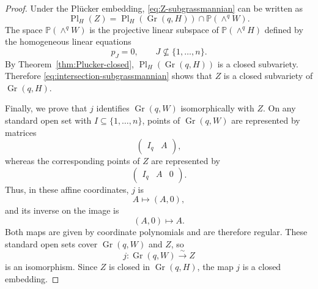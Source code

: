\documentclass[10pt,a4paper]{amsart}
\newcommand{\Gr}{\operatorname{Gr}}
\newcommand{\PP}{\mathbb P}
\newcommand{\Pl}{\operatorname{Pl}}
\begin{document}
\begin{proof}
Under the Pl\"ucker embedding, \eqref{eq:Z-subgrassmannian} can be written as
\begin{equation}\label{eq:intersection-subgrassmannian}
  \Pl_H(Z)
  =\Pl_H(\Gr(q,H))\cap\PP(\wedge^qW).
\end{equation}
The space $\PP(\wedge^qW)$ is the projective linear subspace of
$\PP(\wedge^qH)$ defined by the homogeneous linear equations
\[
  p_J=0,
  \qquad J\nsubseteq\{1,\ldots,n\}.
\]
By Theorem~\ref{thm:Plucker-closed}, $\Pl_H(\Gr(q,H))$ is a closed subvariety.
Therefore \eqref{eq:intersection-subgrassmannian} shows that $Z$ is a closed
subvariety of $\Gr(q,H)$.

Finally, we prove that $j$ identifies $\Gr(q,W)$ isomorphically with $Z$. On any
standard open set with $I\subseteq\{1,\ldots,n\}$, points of $\Gr(q,W)$ are
represented by matrices
\[
  \begin{pmatrix}I_q&A\end{pmatrix},
\]
whereas the corresponding points of $Z$ are represented by
\[
  \begin{pmatrix}I_q&A&0\end{pmatrix}.
\]
Thus, in these affine coordinates, $j$ is
\[
  A\longmapsto(A,0),
\]
and its inverse on the image is
\[
  (A,0)\longmapsto A.
\]
Both maps are given by coordinate polynomials and are therefore regular. These
standard open sets cover $\Gr(q,W)$ and $Z$, so
\[
  j:\Gr(q,W)\xrightarrow{\sim}Z
\]
is an isomorphism. Since $Z$ is closed in $\Gr(q,H)$, the map $j$ is a closed
embedding.
\end{proof}
\end{document}
